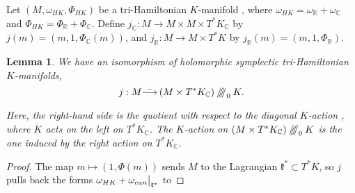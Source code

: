 \documentclass{article}
\newtheorem{lemma}[theorem]{Lemma}
\newcommand{\ra}{\rightarrow}
\newcommand{\w}{\omega}
\newcommand{\RR}{\mathbb{R}}
\newcommand{\CC}{\mathbb{C}}
\newcommand{\mfk}{\mathfrak{k}}
\newcommand{\sssslash}{\mathbin{/\mkern-6mu/\mkern-6mu/\mkern-6mu/}}
\newcommand\restr[2]{{%
		\left.\kern-\nulldelimiterspace %
		#1 %
		\vphantom{\big|} %
		\right|_{#2} %
}}
\begin{document}
	Let $(M, \w_{HK}, \Phi_{HK})$ be a tri-Hamiltonian $K$-manifold , where $\w_{HK} = \w_{\RR} + \w_{\CC}$ and $\Phi_{HK} = \Phi_{\RR} + \Phi_{\CC}$. Define $j_{\CC} : M \ra M \times M \times T^{\ast}K_{\CC}$ by $j(m) = (m, 1, \Phi_{\CC}(m))$, and $j_{\RR} : M \ra M \times T^{\ast}K$ by $j_{\RR}(m) = (m, 1, \Phi_{\RR})$.
		
		\begin{lemma}
			We have an isomorphism of holomorphic symplectic tri-Hamiltonian $K$-manifolds,
				\begin{equation}
					j : M \tilde{\longrightarrow} \left( M \times T^{\ast}K_{\CC} \right) \sssslash_{0} K.
				\end{equation}
			
		Here, the right-hand side is the quotient with respect to the diagonal $K$-action , where $K$ acts on the left on $T^{\ast}K_{\CC}$. The $K$-action on $\left( M \times T^{\ast}K_{\CC} \right) \sssslash_{0} K$ is the one induced by the right action on $T^{\ast}K_{\CC}$.
		\end{lemma}
	
	\begin{proof}
		The map $m \mapsto (1, \Phi(m))$ sends $M$  to the Lagrangian $\mfk^{\ast} \subset T^{\ast}K$,  so $j$ pulls back the forms $\w_{HK} + \restr{\w_{can}}{\mfk^{\ast}}$ to 
	\end{proof}
	
	
	
	

	
	
	
	
	
	
	
	
	
	
	
	
	
	
	
	
	
	
	
	
	
	
	  
	
	
\end{document}
